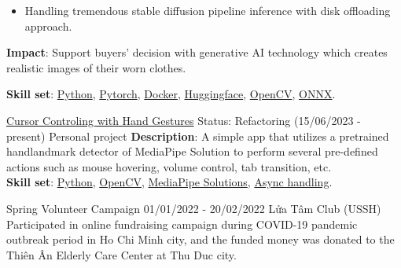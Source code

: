 \documentclass{src/preamble/doc_class}
\begin{document}
\begin{MainPart}
{\begin{itemize}[label=$\bullet$,topsep=-.5ex,itemsep=-0.5ex]
				\item Handling tremendous stable diffusion pipeline inference with disk offloading approach.
			\end{itemize}
			\vspace{0.15cm}
			
			\textbf{Impact}: Support buyers' decision with generative AI technology which creates realistic images of their worn clothes.
			\vspace{.15cm}
			
			\textbf{Skill set}: \href{https://www.python.org/}{Python}, \href{https://pytorch.org/}{Pytorch}, \href{https://www.docker.com/}{Docker}, \href{https://huggingface.co/}{Huggingface}, \href{https://opencv.org/}{OpenCV}, \href{https://onnx.ai/}{ONNX}.
		}
		\end{MainPart}
		\newpage        

	\begin{SecondaryMainBar}{\ColorBackground}{\ColorTextSide}
	\end{SecondaryMainBar}
	
	\begin{SecondaryMainPart}
		\Experience
  		{\ColorHighlight}
  		{\href{https://github.com/diligent-man/Cursor-controlling-with-hand-gestures/tree/main}{Cursor Controling with Hand Gestures}}
  		{Status: Refactoring (15/06/2023 - present)}
  		{Personal project}
  		{
			\textbf{Description}: A simple app that utilizes a pretrained handlandmark detector of MediaPipe Solution to perform several pre-defined actions such as mouse hovering, volume control, tab transition, etc.\\
			
			\vspace{.15cm}
			\textbf{Skill set}: \href{https://www.python.org/}{Python}, \href{https://opencv.org/}{OpenCV}, \href{https://ai.google.dev/edge/mediapipe/solutions/guide}{MediaPipe Solutions}, \href{https://docs.python.org/3/library/asyncio.html}{Async handling}.
		}
		\vspace{.35cm}
		
		\Experience
		{\ColorHighlight}
		{Spring Volunteer Campaign}
		{01/01/2022 - 20/02/2022}
		{Lửa Tâm Club (USSH)}
		{
			Participated in online fundraising campaign during COVID-19 pandemic outbreak period in Ho Chi Minh city, and the funded money was donated to the Thiên Ân Elderly Care Center at Thu Duc city.
		}
	\end{SecondaryMainPart}
\end{document}
